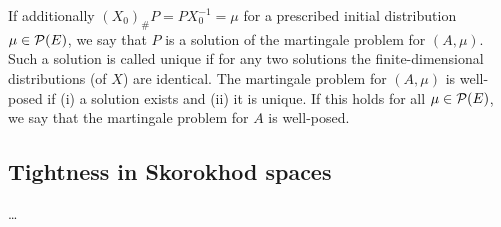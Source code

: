 If additionally $(X_0)_\# P = P X_0^{-1} = \mu$ for a prescribed initial distribution $\mu \in \mathcal{P}(E)$, we say that $P$ is a solution of the martingale problem for $(A,\mu)$.
Such a solution is called unique if for any two solutions the finite-dimensional distributions (of $X$) are identical.
The martingale problem for $(A,\mu)$ is well-posed if (i) a solution exists and (ii) it is unique.
If this holds for all $\mu \in \mathcal{P}(E)$, we say that the martingale problem for $A$ is well-posed.



\subsection{Tightness in Skorokhod spaces}

\dots
